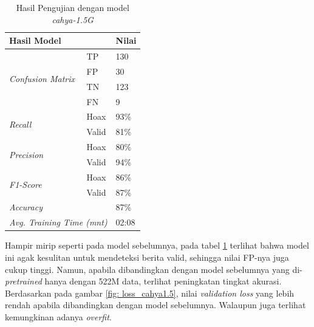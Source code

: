 \begin{table}[h]
    \caption{Hasil Pengujian dengan model \textit{cahya-1.5G}}
    \label{tab: loss_cahya1.5}
    \centering
    \begin{tabular}{|l|l|l|}
        \hline
        \multicolumn{2}{|l|}{\textbf{Hasil Model}}              & \textbf{Nilai}        \\ \hline
        \multirow{4}{*}{\textit{Confusion Matrix}}              & TP             & 130  \\ \cline{2-3}
                                                                & FP             & 30   \\ \cline{2-3}
                                                                & TN             & 123  \\ \cline{2-3}
                                                                & FN             & 9    \\ \hline
        \multirow{2}{*}{\textit{Recall}}                        & Hoax           & 93\% \\ \cline{2-3}
                                                                & Valid          & 81\% \\ \hline
        \multirow{2}{*}{\textit{Precision}}                     & Hoax           & 80\% \\ \cline{2-3}
                                                                & Valid          & 94\% \\ \hline
        \multirow{2}{*}{\textit{F1-Score}}                      & Hoax           & 86\% \\ \cline{2-3}
                                                                & Valid          & 87\% \\ \hline
        \multicolumn{2}{|l|}{\textit{Accuracy}}                 & 87\%                  \\ \hline
        \multicolumn{2}{|l|}{\textit{Avg. Training Time (mnt)}} & 02:08                 \\ \hline
    \end{tabular}
\end{table}

Hampir mirip seperti pada model sebelumnya, pada tabel \ref{tab: loss_cahya1.5} terlihat bahwa model ini agak kesulitan untuk mendeteksi berita valid, sehingga nilai FP-nya juga cukup tinggi. Namun, apabila dibandingkan dengan model sebelumnya yang di-\textit{pretrained} hanya dengan 522M data, terlihat peningkatan tingkat akurasi. Berdasarkan pada gambar \ref{fig: loss_cahya1.5}, nilai \textit{validation loss} yang lebih rendah apabila dibandingkan dengan model sebelumnya. Walaupun juga terlihat kemungkinan adanya \textit{overfit}.

